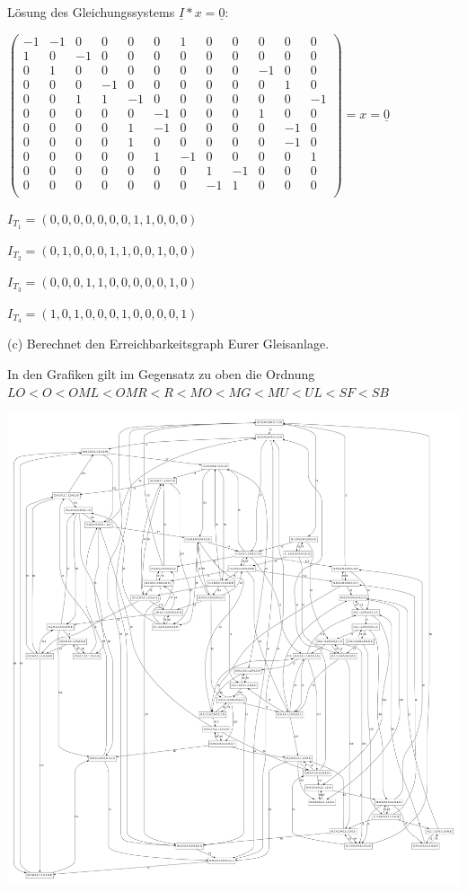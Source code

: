 \documentclass{scrreprt}
\begin{document}
\begin{enumerate}
Lösung des Gleichungssystems \( \underline{I} * x = \underline{0} \):

\( \begin{pmatrix}
-1 &-1 & 0 & 0 & 0 & 0 & 1 & 0 & 0 & 0 & 0 & 0 \\
 1 & 0 &-1 & 0 & 0 & 0 & 0 & 0 & 0 & 0 & 0 & 0 \\
 0 & 1 & 0 & 0 & 0 & 0 & 0 & 0 & 0 &-1 & 0 & 0 \\
 0 & 0 & 0 &-1 & 0 & 0 & 0 & 0 & 0 & 0 & 1 & 0 \\
 0 & 0 & 1 & 1 &-1 & 0 & 0 & 0 & 0 & 0 & 0 &-1 \\
 0 & 0 & 0 & 0 & 0 &-1 & 0 & 0 & 0 & 1 & 0 & 0 \\
 0 & 0 & 0 & 0 & 1 &-1 & 0 & 0 & 0 & 0 &-1 & 0 \\
 0 & 0 & 0 & 0 & 1 & 0 & 0 & 0 & 0 & 0 &-1 & 0 \\
 0 & 0 & 0 & 0 & 0 & 1 &-1 & 0 & 0 & 0 & 0 & 1 \\
 0 & 0 & 0 & 0 & 0 & 0 & 0 & 1 &-1 & 0 & 0 & 0 \\
 0 & 0 & 0 & 0 & 0 & 0 & 0 &-1 & 1 & 0 & 0 & 0 \\
\end{pmatrix} = x = \underline{0} \)

$I_{T_1} = (0, 0, 0, 0, 0, 0, 0, 1, 1, 0, 0, 0)$

$I_{T_2} = (0, 1, 0, 0, 0, 1, 1, 0, 0, 1, 0, 0)$

$I_{T_3} = (0, 0, 0, 1, 1, 0, 0, 0, 0, 0, 1, 0)$

$I_{T_4} = (1, 0, 1, 0, 0, 0, 1, 0, 0, 0, 0, 1)$

(c) Berechnet den Erreichbarkeitsgraph Eurer Gleisanlage.

In den Grafiken gilt im Gegensatz zu oben die Ordnung \(LO < O < OML < OMR < R < MO < MG < MU < UL < SF < SB\)

\includegraphics[width=1\textwidth]{eg.pdf}


\end{enumerate}
\end{document}
